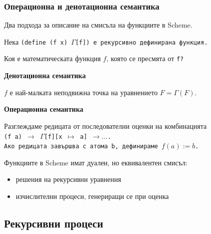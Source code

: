 \documentclass{beamer}
\begin{document}
\begin{frame}
  \frametitle{Операционна и денотационна семантика}

  Два подхода за описание на смисъла на функциите в Scheme.
  \pause

  Нека \tt{(define (f x) $\Gamma$[f])} е рекурсивно дефинирана функция.
  \pause

  \alert{Коя е математическата функция $f$, която се пресмята от \tt f?}
  \vspace{1em}

  \pause
  \textbf{Денотационна семантика}

  $f$ е най-малката неподвижна точка на уравнението $F = \Gamma(F)$.

  \vspace{1em}

  \pause
  \textbf{Операционна семантика}

  Разглеждаме редицата от последователни оценки на комбинацията\\
  \tt{(f a)} $\rightarrow$ \tt{$\Gamma$[f][x $\mapsto$ a]} $\rightarrow\ldots$.\\
  Ако редицата завършва с атома \tt b, дефинираме $f(a) := b$.
  \pause
  \vspace{1em}

  \alert{Функциите в Scheme имат дуален, но еквивалентен смисъл:}
  \begin{itemize}
  \item решения на рекурсивни уравнения
  \item изчислителни процеси, генериращи се при оценка
  \end{itemize}
\end{frame}


\subsection{Рекурсивни процеси}
\end{document}
